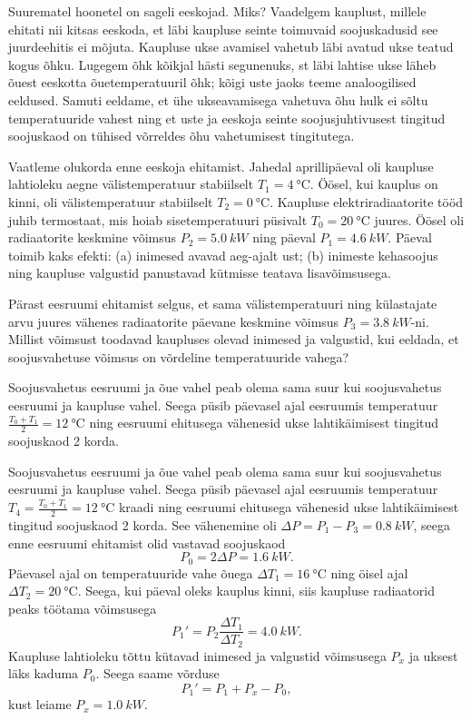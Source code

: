 
Suurematel hoonetel on sageli eeskojad. Miks? 
Vaadelgem kauplust, millele ehitati nii kitsas eeskoda, et
läbi kaupluse seinte toimuvaid soojuskadusid see juurdeehitis ei
mõjuta. Kaupluse ukse avamisel vahetub läbi avatud ukse teatud kogus õhku.
Lugegem õhk kõikjal hästi segunenuks, st läbi lahtise
ukse läheb õuest eeskotta õuetemperatuuril õhk; kõigi uste jaoks teeme
analoogilised eeldused. Samuti
eeldame, et ühe
ukseavamisega vahetuva õhu hulk ei sõltu temperatuuride vahest ning et uste ja
eeskoja seinte soojusjuhtivusest tingitud soojuskaod on tühised võrreldes õhu
vahetumisest tingitutega.

Vaatleme olukorda enne eeskoja ehitamist. Jahedal aprillipäeval oli kaupluse
lahtioleku aegne välistemperatuur stabiilselt $T_1=\SI{4}{\degreeCelsius}$. Öösel, kui kauplus
on kinni, oli välistemperatuur stabiilselt $T_2=\SI{0}{\degreeCelsius}$. Kaupluse
elektriradiaatorite tööd juhib termostaat, mis hoiab sisetemperatuuri püsivalt
$T_0=\SI{20}{\degreeCelsius}$ juures.
Öösel oli radiaatorite keskmine võimsus $P_2= \SI{5,0}{kW}$
ning päeval $P_1=\SI{4,6}{kW}$. Päeval toimib kaks efekti: (a) inimesed avavad
aeg-ajalt ust; (b) inimeste kehasoojus ning kaupluse valgustid panustavad
kütmisse teatava lisavõimsusega. 

Pärast eesruumi ehitamist selgus, et sama välistemperatuuri ning
külastajate arvu juures vähenes radiaatorite päevane keskmine võimsus
\mbox{$P_3=\SI{3,8}{kW}$-ni.} Millist võimsust toodavad kaupluses olevad
inimesed ja valgustid, kui eeldada, et soojusvahetuse võimsus on võrdeline
temperatuuride vahega? 

\hint
Soojusvahetus eesruumi ja õue vahel peab olema sama suur kui soojusvahetus eesruumi ja kaupluse vahel. Seega püsib päevasel ajal eesruumis temperatuur $\frac{T_0+T_1}{2}=\SI{12}{\degreeCelsius}$ ning eesruumi ehitusega vähenesid ukse lahtikäimisest tingitud soojuskaod 2 korda.

\solu
Soojusvahetus eesruumi ja õue vahel peab olema sama suur kui soojusvahetus eesruumi ja kaupluse vahel. Seega püsib päevasel ajal eesruumis temperatuur $T_4=\frac{T_0+T_1}{2}=\SI{12}{\degreeCelsius}$ kraadi ning eesruumi ehitusega vähenesid ukse lahtikäimisest tingitud soojuskaod 2 korda. See vähenemine oli $\Delta P=P_1-P_3=\SI{0,8}{kW}$, seega enne eesruumi ehitamist olid vastavad soojuskaod
\[
P_0=2\Delta P=\SI{1,6}{kW}.
\]
Päevasel ajal on temperatuuride vahe õuega $\Delta T_1=\SI{16}{\degreeCelsius}$ ning öisel ajal $\Delta T_2=\SI{20}{\degreeCelsius}$. Seega, kui päeval oleks kauplus kinni, siis kaupluse radiaatorid peaks töötama võimsusega
\[
P_1'=P_2\frac{\Delta T_1}{\Delta T_2}=\SI{4,0}{kW}.
\]
Kaupluse lahtioleku tõttu kütavad inimesed ja valgustid võimsusega $P_x$ ja uksest läks kaduma $P_0$. Seega saame võrduse
\[
P_1'=P_1+P_x-P_0,
\]
kust leiame $P_x=\SI{1,0}{kW}$.

